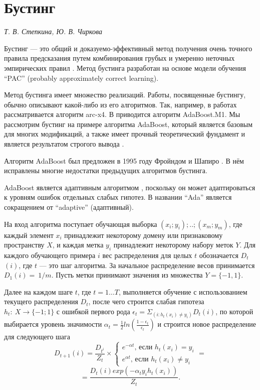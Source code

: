 \section{Бустинг}

\begin{flushright}
\textit{Т. В. Степкина, Ю. В. Чиркова}
\end{flushright} 

Бустинг --- это общий и доказуемо-эффективный метод получения очень точного правила предсказания путем комбинирования грубых и умеренно неточных эмпирических правил \cite{Freund 1999}. Метод бустинга разработан на основе модели обучения ``PAC'' (probably approximately correct learning).

Метод бустинга имеет множество реализаций. Работы, посвященные бустингу, обычно описывают какой-либо из его алгоритмов. Так, например, в работах \cite{Breiman, Marmanis} рассматривается  алгоритм arc-x4. В \cite{Freund 1997, Paclin} приводится алгоритм AdaBoost.M1. Мы рассмотрим бустинг на примере алгоритма AdaBoost, который является базовым для многих модификаций, а также имеет прочный теоретический фундамент и является результатом строгого вывода \cite{Marmanis}.

Алгоритм AdaBoost был предложен в 1995 году Фройндом и Шапиро \cite{Freund 1996}. В нём исправлены многие недостатки предыдущих алгоритмов бустинга.

AdaBoost является адаптивным алгоритмом \cite{Freund 1999}, поскольку он может адаптироваться к уровням ошибок отдельных слабых гипотез. В названии ``Ada'' является сокращением от ``adaptive'' (адаптивный).

На вход алгоритма поступает обучающая выборка $(x_i;y_i);..;(x_m;y_m)$, где каждый элемент $x_i$ принадлежит некоторому домену или признаковому пространству $X$, и каждая метка $y_i$ принадлежит некоторому набору меток $Y$. Для каждого обучающего примера $i$ вес распределения для целых $t$ обозначается $D_t$ $(i)$, где $t$ --- это шаг алгоритма. За начальное распределение весов принимается $D_1(i)=~ 1/m$. Пусть метки принимают значения из множества  $Y=\{-1,1\}$. 

Далее на каждом шаге $t$, где $t = 1 \ldots T$, выполняется обучение с использованием текущего распределения $D_t$, после чего строится слабая гипотеза $h_t:~ X \to \{-1; 1\}$ с ошибкой первого рода $\epsilon_t=\Sigma_{\displaystyle (i:h_t (x_i)\ne y_i)}D_t(i)$, по которой выбирается уровень значимости $\alpha_t=\frac{\displaystyle 1}{\displaystyle 2}ln(\frac{\displaystyle 1-\epsilon_t}{\displaystyle \epsilon_t})$ и строится новое распределение для следующего шага
$$
D_{t+1}(i)=\frac{D_{t^i}}{Z_t} \times 
\begin{cases}
e^{-\alpha t}\text{, если }h_t (x_i) = y_i \\
e^{\alpha t}\text{, если }h_t (x_i)\ne y_i
\end{cases}
=
$$
$$
= \frac{D_t (i)exp(-\alpha_t y_i h_t (x_i))}{Z_t}. 
$$

